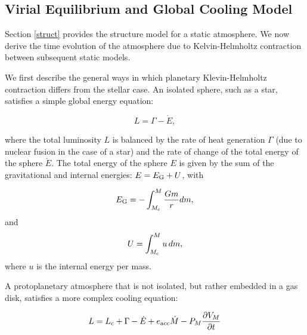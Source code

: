 \documentclass[apj]{emulateapj}
\newcommand{\co}{_{\rm c}}
\begin{document}
\subsection{Virial Equilibrium and Global Cooling Model}
\label{cooling}

Section \ref{struct} provides the structure model for a static atmosphere. We now derive the time evolution of the atmosphere due to Kelvin-Helmholtz contraction between subsequent static models. 

We first describe the general ways in which planetary Klevin-Helmholtz contraction differs from the stellar case. An isolated sphere, such as a star, satisfies a simple global energy equation:

\begin{equation}
\label{eq:coolingstar}
L=\Gamma - \dot{E},
\end{equation}

\noindent where the total luminosity $L$ is balanced by the rate of heat generation $\Gamma$ (due to nuclear fusion in the case of a star) and the rate of change of the total energy of the sphere $\dot{E}$. The total energy of the sphere $E$ is given by the sum of the gravitational and internal energies: $E=E_{\rm G}+U$, with 

\begin{equation}
\label{eq:Eg}
E_{\rm G}=-\int_{M\co}^M \frac{G m}{r} dm,
\end{equation}
and
\begin{equation}
\label{eq:U}
U=\int_{M\co}^M u\, dm,
\end{equation}
where $u$ is the internal energy per mass.

A protoplanetary atmosphere that is not isolated, but rather embedded in a gas disk, satisfies a more complex cooling equation:

\begin{equation}
\label{eq:coolingglobal}
L=L\co+\Gamma-\dot{E}+e_{\mathrm{acc}}\dot{M}-P_M \frac{\partial V_M}{\partial t}
\end{equation}
\end{document}
